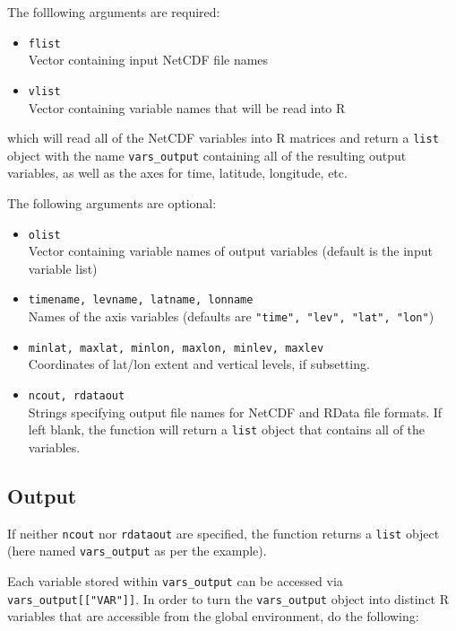 \documentclass{article}
\begin{document}
The folllowing arguments are required:
\begin{itemize}
\item[] \texttt{flist}\\ Vector containing input NetCDF file names
\item[] \texttt{vlist}\\Vector containing variable names that will be read into R
\end{itemize}

which will read all of the NetCDF variables into R matrices and return a \texttt{list} object with the name \texttt{vars\_output} containing all of the resulting output variables, as well as the axes for time, latitude, longitude, etc. 

The following arguments are optional:
\begin{itemize}
\item[] \texttt{olist}\\ Vector containing variable names of output variables (default is the input variable list)
\item[] \texttt{timename, levname, latname, lonname}\\ Names of the axis variables (defaults are \texttt{"time", "lev", "lat", "lon"})
\item[] \texttt{minlat, maxlat, minlon, maxlon, minlev, maxlev}\\ Coordinates of lat/lon extent and vertical levels, if subsetting. 
\item[]\texttt{ncout, rdataout}\\ Strings specifying output file names for NetCDF and RData file formats. If left blank, the function will return a \texttt{list} object that contains all of the variables. 
\end{itemize}



\subsection{Output}

If neither \texttt{ncout} nor \texttt{rdataout} are specified, the function returns a \texttt{list} object (here named \texttt{vars\_output} as per the example).

Each variable stored within \texttt{vars\_output} can be accessed via \texttt{vars\_output[["VAR"]]}. In order to turn the \texttt{vars\_output} object into distinct R variables that are accessible from the global environment, do the following:
\end{document}
